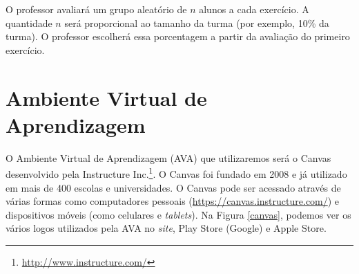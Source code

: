 \documentclass[12pt,a4paper,oneside]{article}
\begin{document}
O professor avaliará um grupo aleatório de $n$ alunos a cada exercício. A quantidade $n$ será proporcional ao tamanho da turma (por exemplo, 10\% da turma). O professor escolherá essa porcentagem a partir da avaliação do primeiro exercício.

\section{Ambiente Virtual de Aprendizagem} \label{crit}

O Ambiente Virtual de Aprendizagem (AVA) que utilizaremos será o {\sf Canvas} desenvolvido pela {\sf Instructure Inc.}\footnote{\url{http://www.instructure.com/}}. O {\sf Canvas} foi fundado em 2008 e já utilizado em mais de 400 escolas e universidades. O {\sf Canvas} pode ser acessado através de várias formas como computadores pessoais (\url{https://canvas.instructure.com/}) e dispositivos móveis (como celulares e {\it tablets}). Na Figura \ref{canvas}, podemos ver os vários logos utilizados pela AVA no {\it site}, {\sf Play Store} ({\sf Google}) e {\sf Apple Store}.
\end{document}
